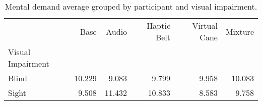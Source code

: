 
\begin{table}[!htb]
\centering
\caption{Mental demand average grouped by participant and visual impairment.}
\label{tab:md_average_group}
\begin{tabular}{lrrrrr}
\toprule
{} &   Base &  Audio &  Haptic Belt &  Virtual Cane &  Mixture \\
Visual Impairment &        &        &              &               &          \\
\midrule
Blind             & 10.229 &  9.083 &        9.799 &         9.958 &   10.083 \\
Sight             &  9.508 & 11.432 &       10.833 &         8.583 &    9.758 \\
\bottomrule
\end{tabular}
\end{table}

